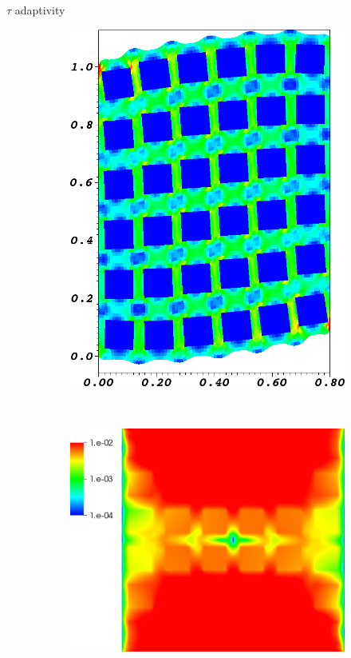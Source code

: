 \documentclass{beamer}
\begin{document}
\begin{frame}{$\tau$ adaptivity}
\begin{figure}
\begin{subfigure}[b]{0.18\textwidth}
    \includegraphics[width=\textwidth]{figures/MG/ElasticityCompressShearTrim}
  \end{subfigure} ~
  \begin{subfigure}[b]{0.28\textwidth}
    \includegraphics[width=\textwidth]{figures/MG/ElasticityCompressErrorNoTauTrim}

\end{subfigure}
\end{figure}
\end{frame}
\end{document}
